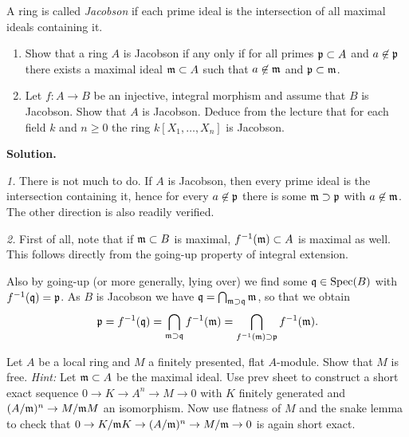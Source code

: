 \documentclass[a4paper,11pt]{article}
\begin{document}
A ring is called \textit{Jacobson} if each prime ideal is the intersection
of all maximal ideals containing it. 
\begin{enumerate}
    \item Show that a ring $A$ is Jacobson if any only if for all primes
        $\mathfrak{p} \subset A$ and $a \not \in \mathfrak{p}$ there exists a 
        maximal ideal $\mathfrak{m} \subset A$ such that $a \not \in \mathfrak{m}$
        and $\mathfrak{p} \subset \mathfrak{m}$. 
    \item Let $f: A\to B$ be an injective, integral morphism and assume that 
        $B$ is Jacobson. Show that $A$ is Jacobson. Deduce from the lecture
        that for each field $k$ and $n \geq 0$ the ring
        $k[X_1, \dots, X_n]$ is Jacobson.
\end{enumerate}

\textbf{Solution.}

\textit{1.} There is not much to do. If $A$ is Jacobson, then every prime 
ideal is the intersection containing it, hence for every $a \not \in \mathfrak{p}$ there
is some $\mathfrak{m} \supset \mathfrak{p}$ with $a \not \in \mathfrak{m}$. The other direction is also readily
verified.

\textit{2.} First of all, note that if $\mathfrak{m} \subset B$ is maximal, $f^{-1}(\mathfrak{m})
\subset A$ is maximal as well. This follows directly from the going-up property
of integral extension. 

Also by going-up (or more generally, lying over) we find some $\mathfrak{q} \in \operatorname{Spec}(B)$
with $f^{-1}(\mathfrak{q}) = \mathfrak{p}$. As $B$ is Jacobson we have $\mathfrak{q} = \bigcap_{\mathfrak{m} \supset
\mathfrak{q}} \mathfrak{m}$, so that we obtain 
$$\mathfrak{p} = f^{-1}(\mathfrak{q}) = \bigcap_{\mathfrak{m} \supset \mathfrak{q}} f^{-1}(\mathfrak{m}) = 
\bigcap_{f^{-1}(\mathfrak{m}) \supset \mathfrak{p}} f^{-1}(\mathfrak{m}).$$



Let $A$ be a local ring and $M$ a finitely presented, flat $A$-module.
Show that $M$ is free. \textit{Hint:} Let $\mathfrak{m} \subset A$ be the maximal ideal.
Use prev sheet to construct a short exact sequence $0 \to K \to A^n \to M \to 0$
with $K$ finitely generated and $(A/\mathfrak{m})^n \to M/\mathfrak{m} M$ an isomorphism.
Now use flatness of $M$ and the snake lemma to check that $0 \to K/\mathfrak{m} K
\to (A/\mathfrak{m})^n \to M/\mathfrak{m} \to 0$ is again short exact.
\end{document}
